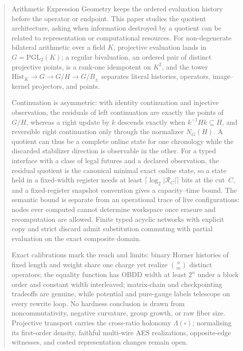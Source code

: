\documentclass[11pt]{article}
\theoremstyle{definition}
\theoremstyle{remark}
\begin{document}
\begin{abstract}Arithmetic Expression Geometry keeps the ordered evaluation history before the
operator or endpoint.  This paper studies the quotient architecture, asking when
information destroyed by a quotient can be related to representation or
computational resources.  For non-degenerate bilateral arithmetic over a field
$K$, projective evaluation lands in $G=\mathrm{PGL}_2(K)$; a regular bivaluation, an ordered pair of distinct projective
points, is a rank-one idempotent on $K^2$, and the tower $\mathrm{Hist}_K\to G\to G/H\to G/B_\pm$ separates literal
histories, operators, image--kernel projectors, and points.

Continuation is asymmetric: with identity continuation and injective
observation, the residuals of left continuation are exactly the points of
$G/H$, whereas a right update by $k$ descends exactly when
$k^{-1}Hk\subseteq H$, and reversible right continuation only through the
normalizer $N_G(H)$.  A quotient can thus be a complete online state for one
chronology while the discarded stabilizer direction is observable in the other.  For a typed interface with a class of legal futures and a declared
observation, the residual quotient is the canonical minimal exact online state, so a state held in a fixed-width register needs at least
$\lceil\log_2|\mathcal R_C|\rceil$ bits at the cut~$C$, and a fixed-register
snapshot convention gives a capacity--time bound.  The semantic bound is separate from an operational
trace of live configurations: nodes ever computed cannot determine workspace once
erasure and recomputation are allowed.  Finite typed acyclic networks
with explicit copy and strict discard admit substitution commuting with partial
evaluation on the exact composite domain.

Exact calibrations mark the reach and limits: binary Horner histories of fixed
length and weight share one charge yet realize $\binom nm$ distinct operators; the
equality function has OBDD width at least $2^n$ under a block order and constant
width interleaved; matrix-chain and checkpointing tradeoffs are genuine, while
potential and pure-gauge labels telescope on every rewrite loop.  No hardness conclusion is drawn from
noncommutativity, negative curvature, group growth, or raw fiber size.
Projective transport carries the cross-ratio holonomy $\Lambda(\square)$;
normalising its first-order density, faithful multi-wire AES realizations,
opposite-edge witnesses, and costed representation
changes remain open.\end{abstract}
\end{document}
